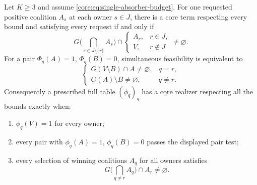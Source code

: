 \begin{theorem}
\label{core:thm:simultaneous-profile-budgets}
Let $K\geq3$ and assume \eqref{core:eq:single-absorber-budget}.
For one requested positive coalition $A_s$ at each owner $s\in J$,
there is a core term respecting every bound and satisfying every
request if and only if
\[
 G\biggl(\bigcap_{s\in J\setminus\{r\}}A_s\biggr)
 \cap\begin{cases}A_r,&r\in J,\\V,&r\notin J\end{cases}
 \ne\varnothing.
\]
For a pair $\Phi_q(A)=1$, $\Phi_q(B)=0$, simultaneous feasibility is
equivalent to
\[
 \begin{cases}
  G(V\setminus B)\cap A\ne\varnothing,&q=r,\\
  G(A)\setminus B\ne\varnothing,&q\ne r.
 \end{cases}
\]
Consequently a prescribed full table $(\phi_q)_q$ has a core realizer
respecting all the bounds exactly when:
\begin{enumerate}
\item $\phi_q(V)=1$ for every owner;
\item every pair with $\phi_q(A)=1$, $\phi_q(B)=0$ passes the displayed
  pair test;
\item every selection of winning coalitions $A_q$ for all owners satisfies
  \[
   G\biggl(\bigcap_{q\ne r}A_q\biggr)\cap A_r\ne\varnothing.
  \]
\end{enumerate}
\end{theorem}
